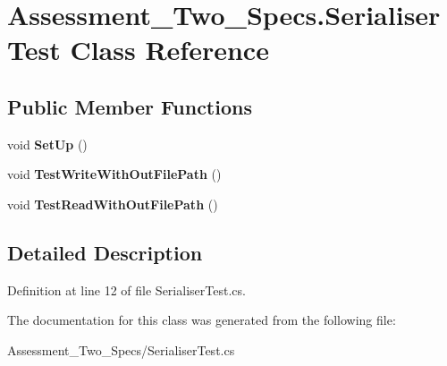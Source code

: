 \hypertarget{class_assessment___two___specs_1_1_serialiser_test}{
\section{Assessment\_\-Two\_\-Specs.SerialiserTest Class Reference}
\label{class_assessment___two___specs_1_1_serialiser_test}
}
\subsection*{Public Member Functions}
\begin{DoxyCompactItemize}
\item 
\hypertarget{class_assessment___two___specs_1_1_serialiser_test_a8e92351e6e1289b87d4ba365e5fda63a}{
void {\bfseries SetUp} ()}
\label{class_assessment___two___specs_1_1_serialiser_test_a8e92351e6e1289b87d4ba365e5fda63a}

\item 
\hypertarget{class_assessment___two___specs_1_1_serialiser_test_ae105cbdd29309104b90d622d7e6cb059}{
void {\bfseries TestWriteWithOutFilePath} ()}
\label{class_assessment___two___specs_1_1_serialiser_test_ae105cbdd29309104b90d622d7e6cb059}

\item 
\hypertarget{class_assessment___two___specs_1_1_serialiser_test_aec57bcf2364aafa8b6469430a2a1427c}{
void {\bfseries TestReadWithOutFilePath} ()}
\label{class_assessment___two___specs_1_1_serialiser_test_aec57bcf2364aafa8b6469430a2a1427c}

\end{DoxyCompactItemize}


\subsection{Detailed Description}


Definition at line 12 of file SerialiserTest.cs.



The documentation for this class was generated from the following file:\begin{DoxyCompactItemize}
\item 
Assessment\_\-Two\_\-Specs/SerialiserTest.cs\end{DoxyCompactItemize}
